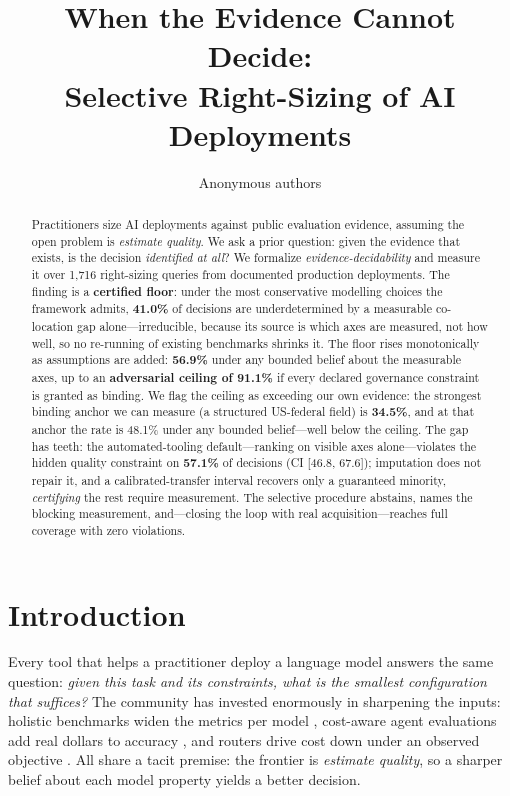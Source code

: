 \documentclass{article} %
\title{When the Evidence Cannot Decide:\\ Selective Right-Sizing of AI Deployments}
\author{Anonymous authors}
\begin{document}
\maketitle

\begin{abstract}
Practitioners size AI deployments against public evaluation evidence, assuming the open problem is \emph{estimate quality}. We ask a prior question: given the evidence that exists, is the decision \emph{identified at all}? We formalize \emph{evidence-decidability} and measure it over 1{,}716 right-sizing queries from documented production deployments. The finding is a \textbf{certified floor}: under the most conservative modelling choices the framework admits, \textbf{41.0\%} of decisions are underdetermined by a measurable co-location gap alone---irreducible, because its source is which axes are measured, not how well, so no re-running of existing benchmarks shrinks it. The floor rises monotonically as assumptions are added: \textbf{56.9\%} under any bounded belief about the measurable axes, up to an \textbf{adversarial ceiling of 91.1\%} if every declared governance constraint is granted as binding. We flag the ceiling as exceeding our own evidence: the strongest binding anchor we can measure (a structured US-federal field) is \textbf{34.5\%}, and at that anchor the rate is 48.1\% under any bounded belief---well below the ceiling. The gap has teeth: the automated-tooling default---ranking on visible axes alone---violates the hidden quality constraint on \textbf{57.1\%} of decisions (CI [46.8, 67.6]); imputation does not repair it, and a calibrated-transfer interval recovers only a guaranteed minority, \emph{certifying} the rest require measurement. The selective procedure abstains, names the blocking measurement, and---closing the loop with real acquisition---reaches full coverage with zero violations.
\end{abstract}

\section{Introduction}
\label{sec:intro}

Every tool that helps a practitioner deploy a language model answers the same question: \emph{given this task and its constraints, what is the smallest configuration that suffices?} The community has invested enormously in sharpening the inputs: holistic benchmarks widen the metrics per model \citep{liang2022helm}, cost-aware agent evaluations add real dollars to accuracy \citep{kapoor2024agents,stroebl2025hal}, and routers drive cost down under an observed objective \citep{chen2023frugalgpt,hu2024routerbench,ong2024routellm}. All share a tacit premise: the frontier is \emph{estimate quality}, so a sharper belief about each model property yields a better decision.
\end{document}
